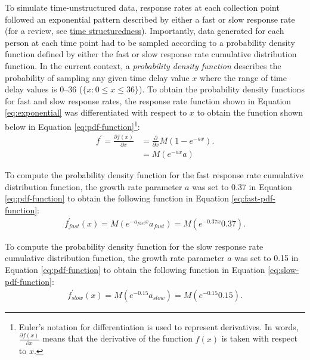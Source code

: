 \documentclass[
12pt, %
twoside,
english]{guelphthesis}
\begin{document}
To simulate time-unstructured data, response rates at each collection
point followed an exponential pattern described by either a fast or slow
response rate (for a review, see \protect\hyperlink{time-structuredness}{time structuredness}). Importantly, data generated
for each person at each time point had to be sampled according to a
probability density function defined by either the fast or slow response
rate cumulative distribution function. In the current context, a
\emph{probability density function} describes the probability of sampling
any given time delay value \(x\) where the range of time delay values is
0--36 (\(\{x : 0 \le x \le 36 \}\)). To obtain the probability density functions
for fast and slow response rates, the response rate function shown in
Equation \eqref{eq:exponential} was differentiated with respect to \(x\) to
obtain the function shown below in Equation \ref{eq:pdf-function}\footnote{Euler's notation for differentiation is used to represent derivatives. In words, $\frac{\partial f(x)}{\partial x}$ means that the derivative of the function $f(x)$ is taken with respect to $x$.}:
\begin{align}
f^\prime = \frac{\partial f(x)}{\partial x} &= \frac{\partial}{\partial x}M(1 - e^{-ax}). \nonumber \\
&= M (e^{-ax}a)
\label{eq:pdf-function}
\end {align}

\noindent To compute the probability density function for the fast
response rate cumulative distribution function, the growth rate
parameter \(a\) was set to 0.37 in Equation \ref{eq:pdf-function} to
obtain the following function in Equation \ref{eq:fast-pdf-function}:
\begin{align}
f^\prime_{fast}(x) = M (e^{-a_{fast}x}a_{fast}) = M (e^{-0.37x}0.37). 
\label{eq:fast-pdf-function}
\end {align}

\noindent To compute the probability density function for the slow
response rate cumulative distribution function, the growth rate
parameter \(a\) was set to 0.15 in Equation \ref{eq:pdf-function} to
obtain the following function in Equation \ref{eq:slow-pdf-function}:
\begin{align}
f^\prime_{slow}(x) = M (e^{-0.15}a_{slow}) = M (e^{-0.15}0.15). 
\label{eq:slow-pdf-function}
\end {align}
\end{document}
